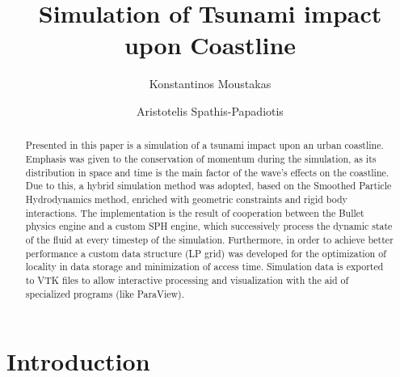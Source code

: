 \documentclass{llncs}
\begin{document}
\title{Simulation of Tsunami impact upon Coastline}


\author{Konstantinos Moustakas \and Aristotelis Spathis-Papadiotis}



\maketitle

\begin{abstract}
  Presented in this paper is a simulation of a tsunami impact upon an urban
  coastline. Emphasis was given to the conservation of momentum during the simulation, as
  its distribution in space and time is the main factor of the wave's effects on the
  coastline. Due to this, a hybrid simulation method was adopted, based on the Smoothed
  Particle Hydrodynamics method, enriched with geometric constraints and rigid body
  interactions. The implementation is the result of cooperation between the Bullet physics
  engine and a custom SPH engine, which successively process the dynamic state of the
  fluid at every timestep of the simulation. Furthermore, in order to achieve better
  performance a custom data structure (LP grid) was developed for the optimization of
  locality in data storage and minimization of access time. Simulation data is exported to
  VTK files to allow interactive processing and visualization with the aid of specialized
  programs (like ParaView\texttrademark). 
\end{abstract}

\section{Introduction}
\end{document}
